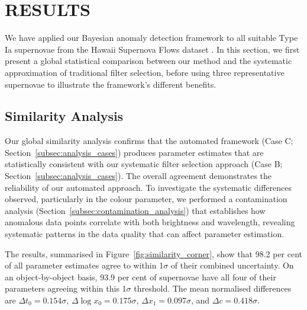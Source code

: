 \section{RESULTS}
\label{sec:results}

We have applied our Bayesian anomaly detection framework to all suitable Type Ia supernovae from the Hawaii Supernova Flows dataset \citep{do2025hawaii}. In this section, we first present a global statistical comparison between our method and the systematic approximation of traditional filter selection, before using three representative supernovae to illustrate the framework's different benefits.

\subsection{Similarity Analysis}

Our global similarity analysis confirms that the automated framework (Case C; Section~\ref{subsec:analysis_cases}) produces parameter estimates that are statistically consistent with our systematic filter selection approach (Case B; Section~\ref{subsec:analysis_cases}). The overall agreement demonstrates the reliability of our automated approach. To investigate the systematic differences observed, particularly in the colour parameter, we performed a contamination analysis (Section~\ref{subsec:contamination_analysis}) that establishes how anomalous data points correlate with both brightness and wavelength, revealing systematic patterns in the data quality that can affect parameter estimation.

The results, summarised in Figure~\ref{fig:similarity_corner}, show that 98.2 per cent of all parameter estimates agree to within 1$\sigma$ of their combined uncertainty. On an object-by-object basis, 93.9 per cent of supernovae have all four of their parameters agreeing within this 1$\sigma$ threshold. The mean normalised differences are $\Delta t_0 = 0.154\sigma$, $\Delta \log x_0 = 0.175\sigma$, $\Delta x_1 = 0.097\sigma$, and $\Delta c = 0.418\sigma$.

